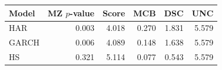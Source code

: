 
\begin{tabular}[t]{lrrrrr}
\toprule
Model & MZ $p$-value & Score & MCB & DSC & UNC\\
\midrule
HAR & 0.003 & 4.018 & 0.270 & 1.831 & 5.579\\
GARCH & 0.006 & 4.089 & 0.148 & 1.638 & 5.579\\
HS & 0.321 & 5.114 & 0.077 & 0.543 & 5.579\\
\bottomrule
\end{tabular}
